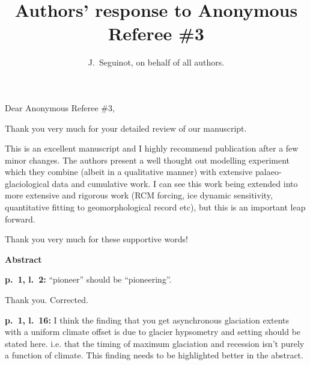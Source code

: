 

\title{Authors' response to Anonymous Referee \#3}
\author{J.~Seguinot, on behalf of all authors.}


\maketitle
\bigskip


\newcommand{\sechead}[1]{\bigskip\noindent\textbf{#1}}
\newcommand{\referee}[1]{\bigskip\noindent\textcolor{journalname}{#1}}
\newcommand{\msquote}[1]{\begin{quote}\textit{#1}\end{quote}}
\newcommand{\doi}[1]{doi:\allowbreak\href{http://dx.doi.org/#1}{#1}}

Dear Anonymous Referee \#3,

Thank you very much for your detailed review of our manuscript.

    \referee{%
        This is an excellent manuscript and I highly recommend publication
        after a few minor changes. The authors present a well thought out
        modelling experiment which they combine (albeit in a qualitative
        manner) with extensive palaeo-glaciological data and cumulative work. I
        can see this work being extended into more extensive and rigorous work
        (RCM forcing, ice dynamic sensitivity, quantitative fitting to
        geomorphological record etc), but this is an important leap forward.}

    Thank you very much for these supportive words!



\sechead{Abstract}

    \referee{\textbf{p.~1, l.~2:}
        ``pioneer'' should be ``pioneering''.}

    Thank you. Corrected.

    \referee{\textbf{p.~1, l.~16:}
        I think the finding that you get asynchronous glaciation extents with a
        uniform climate offset is due to glacier hypsometry and setting should
        be stated here. i.e.  that the timing of maximum glaciation and
        recession isn't purely a function of climate. This finding needs to be
        highlighted better in the abstract.}

